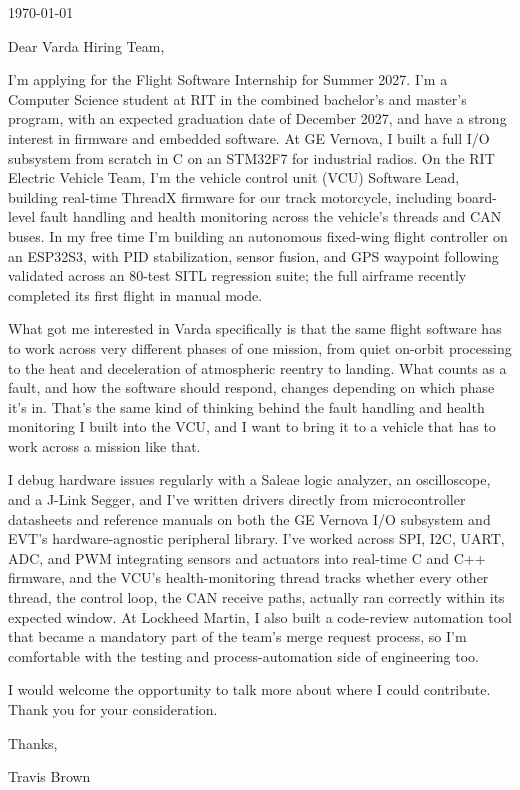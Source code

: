\documentclass[11pt]{article}
\begin{document}
\begin{flushright}
  \today
\end{flushright}

Dear Varda Hiring Team,

I'm applying for the Flight Software Internship for Summer 2027. I'm a
Computer Science student at RIT in the combined bachelor's and master's
program, with an expected graduation date of December 2027, and have a
strong interest in firmware and embedded software. At GE Vernova, I built a
full I/O subsystem from scratch in C on an STM32F7 for industrial radios.
On the RIT Electric Vehicle Team, I'm the vehicle control unit (VCU)
Software Lead, building real-time ThreadX firmware for our track
motorcycle, including board-level fault handling and health monitoring
across the vehicle's threads and CAN buses. In my free time I'm building an
autonomous fixed-wing flight controller on an ESP32S3, with PID
stabilization, sensor fusion, and GPS waypoint following validated across
an 80-test SITL regression suite; the full airframe recently completed its
first flight in manual mode.

What got me interested in Varda specifically is that the same flight
software has to work across very different phases of one mission, from
quiet on-orbit processing to the heat and deceleration of atmospheric
reentry to landing. What counts as a fault, and how the software should
respond, changes depending on which phase it's in. That's the same kind of
thinking behind the fault handling and health monitoring I built into the
VCU, and I want to bring it to a vehicle that has to work across a mission
like that.

I debug hardware issues regularly with a Saleae logic analyzer, an
oscilloscope, and a J-Link Segger, and I've written drivers directly from
microcontroller datasheets and reference manuals on both the GE Vernova I/O
subsystem and EVT's hardware-agnostic peripheral library. I've worked
across SPI, I2C, UART, ADC, and PWM integrating sensors and actuators into
real-time C and C++
firmware, and the VCU's health-monitoring thread tracks whether every other
thread, the control loop, the CAN receive paths, actually ran correctly
within its expected window. At Lockheed Martin, I also built a code-review
automation tool that became a mandatory part of the team's merge request
process, so I'm comfortable with the testing and process-automation side
of engineering too.

I would welcome the opportunity to talk more about where I could
contribute. Thank you for your consideration.

Thanks,

Travis Brown
\end{document}
